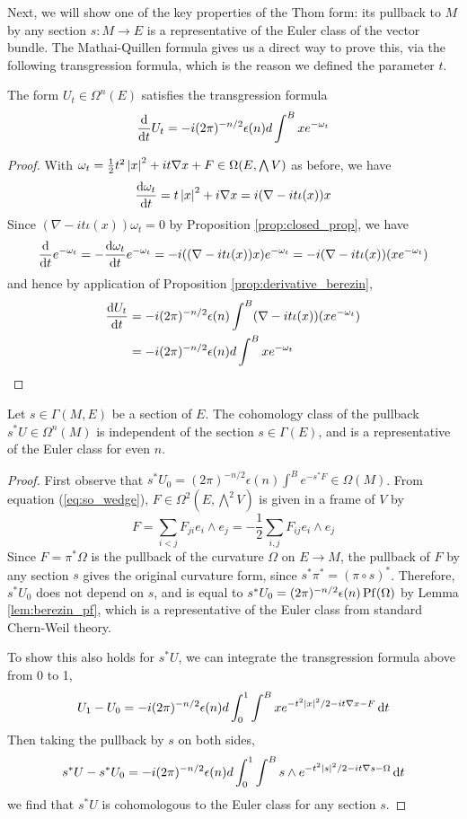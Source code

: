 Next, we will show one of the key properties of the Thom form: its pullback to
$M$ by any section  $s:M\to E$ is a representative of the Euler class of the
vector bundle. The Mathai-Quillen formula gives us a direct way to prove this, 
via the following transgression formula, which is the reason we defined the 
parameter $t$. 
\begin{lem} %
	The form $U_t \in \Omega^n(E)$ satisfies the transgression formula
	\[
	\odv{}{t} U_t = -i(2\pi)^{-n /2}\epsilon(n) d\int^B x e^{-\omega_t}
	\] 
\end{lem}
\begin{proof}
	With $\omega_t = \frac{1}{2}t^2\abs{x}^2+it\nabla x + F \in
	\Omega(E,\bigwedge V)$ as before, we have 
	\[
		\odv{\omega_t}{t} = t\abs{x}^2 + i\nabla x = i(\nabla - it\iota(x)) x
	\] 
	Since $(\nabla - it\iota(x))\omega_t = 0$ by Proposition
	\ref{prop:closed_prop}, we have 
	 \[
	\odv{}{t}e^{-\omega_t} = - \odv{\omega_t}{t} e^{-\omega_t} 
	= -i((\nabla	-it\iota(x))x) e^{-\omega_t}
	= -i(\nabla	-it\iota(x))(x e^{-\omega_t})
	\] 
	and hence by application of Proposition \ref{prop:derivative_berezin},
	\begin{align*}
		\odv{U_t}{t} 
		&= -i(2\pi)^{-n /2}\epsilon(n) \int^B (\nabla-it\iota(x))(x e^{-\omega_t})\\
		&= -i(2\pi)^{-n /2}\epsilon(n) d\int^B x e^{-\omega_t} 
	\end{align*}
\end{proof}
\begin{prop} \label{prop:thom_pullback}
	Let $s\in \Gamma(M,E)$ be a section of $E$.
	The cohomology class of the pullback $s^*U \in \Omega^{n}(M)$
	is independent of the section  $s\in\Gamma(E)$, and is a representative of
	the Euler class for even $n$.
\end{prop}
\begin{proof}
	First observe that $s^*U_0 = (2\pi)^{-n /2}\epsilon(n)\int^B e^{-s^*F} \in \Omega(M)$. 
	From equation (\ref{eq:so_wedge}), $F\in \Omega^2(E,\bigwedge^2 V)$ is 
	given in a frame of $V$ by
	 \[
	F = \sum_{i< j} F_{ji} e_i \wedge e_j
	= -\frac{1}{2}\sum_{i,j} F_{ij} e_i \wedge e_j
	\] 
	Since $F= \pi^* \Omega$ is the pullback of the curvature $\Omega$ on $E\to M$, the
	pullback of $F$ by any section $s$ gives the original curvature form, since
	$s^*\pi^* = (\pi\circ s)^*$. Therefore, $s^*U_0$ does not depend on $s$, and
	is equal to  $s^*U_0 = (2\pi)^{-n /2}\epsilon(n) \operatorname{Pf}(\Omega)$ by 
	Lemma \ref{lem:berezin_pf}, which is a representative of the Euler class
	from standard Chern-Weil theory. 

	To show this also holds for $s^*U$, 
	we can integrate the transgression formula above from 0 to 1, 
	\[
		U_1 - U_0 = -i(2\pi)^{-n /2}\epsilon(n)d\int_0^1\int^B x e^{-t^2\abs{x}^2/2 -
		it\nabla x - F} \odif{t}
	\] 
	Then taking the pullback by $s$ on both sides,   
	\[
		s^*U - s^*U_0 = -i(2\pi)^{-n /2}\epsilon(n)
		d\int_0^1\int^B s\wedge e^{-t^2\abs{s}^2/2 -
		it\nabla s - \Omega} \odif{t}
	\] 
	we find that $s^*U$ is
	cohomologous to the Euler class for any section $s$.
\end{proof}


